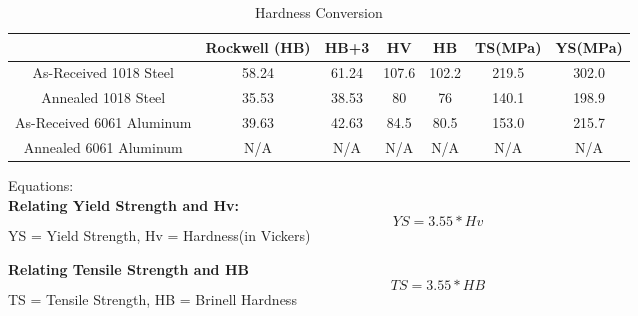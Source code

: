 \documentclass{article}
\begin{document}
\begin{table}[h]
\centering
\caption{Hardness Conversion}
\begin{tabular}{||c | c | c | c | c | c | c||}
	\hline
	\ 	&
	Rockwell (HB)& HB+3 & HV & HB & TS(MPa) & YS(MPa)\\
	\hline\hline
	As-Received 1018 Steel		&
	58.24	&	61.24	&	107.6	&	102.2	& 219.5	& 302.0\\
	Annealed 1018 Steel		&
	35.53	&	38.53	&	80	&	76	& 140.1	& 198.9\\
	As-Received 6061 Aluminum	&
	39.63	&	42.63	& 84.5	& 80.5	& 153.0	& 215.7\\
	Annealed 6061 Aluminum	&
	N/A & N/A & N/A & N/A & N/A & N/A\\
	\hline
\end{tabular}
\end{table}

Equations:\\

\textbf{Relating Yield Strength and Hv:}
\begin{equation}
YS = 3.55 * Hv
\end{equation}
YS = Yield Strength, Hv = Hardness(in Vickers)

\textbf{Relating Tensile Strength and HB}
\begin{equation}
TS = 3.55 * HB
\end{equation}
TS = Tensile Strength, HB = Brinell Hardness
\end{document}

